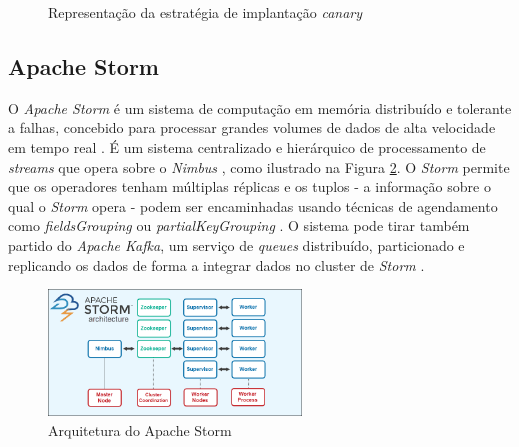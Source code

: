 \begin{figure}[H]
    \centering
    \qquad
    \caption{Representação da estratégia de implantação \textit{canary}}%
    \label{fig:blue-green}%
\end{figure}

\subsection{Apache Storm}

O \textit{Apache Storm} é um sistema de computação em memória distribuído e tolerante a falhas, 
concebido para processar grandes volumes de dados de alta velocidade em tempo real \cite{storm2017}. 
É um sistema centralizado e hierárquico de processamento de \textit{streams} que opera sobre o 
\textit{Nimbus} \cite{storm2015}, como ilustrado na Figura \ref{fig:storm-architecture}. O 
\textit{Storm} permite que os operadores tenham múltiplas réplicas e os tuplos - a informação 
sobre o qual o \textit{Storm} opera - podem ser encaminhadas usando técnicas de agendamento como 
\textit{fieldsGrouping} ou \textit{partialKeyGrouping} \cite{storm2018}. O sistema pode tirar 
também partido do \textit{Apache Kafka}, um serviço de \textit{queues} distribuído, particionado e 
replicando os dados de forma a integrar dados no \gls{cluster} de \textit{Storm} \cite{storm2018b}.

\begin{figure}[H]
    \centering
    \includegraphics[width=0.6\textwidth]{media/content/estado-arte/apache-storm-architecture.png}
    \caption{Arquitetura do Apache Storm}
    \label{fig:storm-architecture}
\end{figure}


